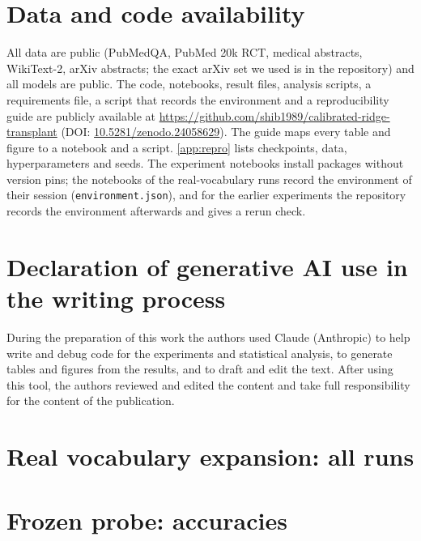 \documentclass[preprint,12pt]{elsarticle}
\begin{document}
\section*{Data and code availability}
All data are public (PubMedQA, PubMed 20k RCT, medical abstracts, WikiText-2, arXiv abstracts; the exact arXiv set we used is in the repository) and all models are public. The code, notebooks, result files, analysis scripts, a requirements file, a script that records the environment and a reproducibility guide are publicly available at \url{https://github.com/shib1989/calibrated-ridge-transplant} (DOI: \href{https://doi.org/10.5281/zenodo.24058629}{10.5281/zenodo.24058629}). The guide maps every table and figure to a notebook and a script. \ref{app:repro} lists checkpoints, data, hyperparameters and seeds. The experiment notebooks install packages without version pins; the notebooks of the real-vocabulary runs record the environment of their session (\texttt{environment.json}), and for the earlier experiments the repository records the environment afterwards and gives a rerun check.

\section*{Declaration of generative AI use in the writing process}
During the preparation of this work the authors used Claude (Anthropic) to help write and debug code for the experiments and statistical analysis, to generate tables and figures from the results, and to draft and edit the text. After using this tool, the authors reviewed and edited the content and take full responsibility for the content of the publication.

\appendix
\section{Real vocabulary expansion: all runs}
\label{app:rv}
\begin{table}[H]
\centering\scriptsize
\caption{Ridge minus each method, NLL per sentence in nats, for each of the 12 runs (negative = ridge better; $^{*}$ 95\,\% interval excludes 0). ``vs.\ unch.'' = ridge minus the unchanged receiver; OMP-64c = official OMP-64 on centred inputs; OMP-64s = as shipped; OMP-32 = our scikit-learn implementation.}
\label{tab:rvfull}
\resizebox{\textwidth}{!}{}
\end{table}

\section{Frozen probe: accuracies}
\label{app:probe}
\begin{table}[H]
\centering\small
\caption{Frozen-probe accuracy (logistic regression on frozen features; emb = embedding layer, mid = middle layer, last = last layer). Majority-class accuracy 0.334.}
\label{tab:frozenacc}
\resizebox{\textwidth}{!}{}
\end{table}
\end{document}
